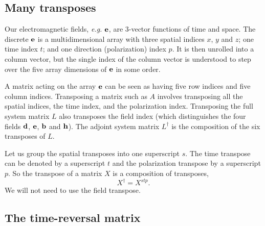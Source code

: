 \subsection{Many transposes}

Our electromagnetic fields, \emph{e.g.} $\textbf{e}$, are 3-vector functions of time and space.  The discrete $\textbf{e}$ is a multidimensional array with three spatial indices $x$, $y$ and $z$; one time index $t$; and one direction (polarization) index $p$.  It is then unrolled into a column vector, but the single index of the column vector is understood to step over the five array dimensions of $\textbf{e}$ in some order.

A matrix acting on the array $\textbf{e}$ can be seen as having five row indices and five column indices.  Transposing a matrix such as $A$ involves transposing all the spatial indices, the time index, and the polarization index.  Transposing the full system matrix $L$ also transposes the field index (which distinguishes the four fields $\textbf{d}$, $\textbf{e}$, $\textbf{b}$ and $\textbf{h}$).  The adjoint system matrix $L^\dagger$ is the composition of the six transposes of $L$.

Let us group the spatial transposes into one superscript $s$.  The time transpose can be denoted by a superscript $t$ and the polarization transpose by a superscript $p$.  So the transpose of a matrix $X$ is a composition of transposes,
%
\begin{equation}
X^\dagger = X^{stp}.
\end{equation}
%
We will not need to use the field transpose.

\subsection{The time-reversal matrix}

